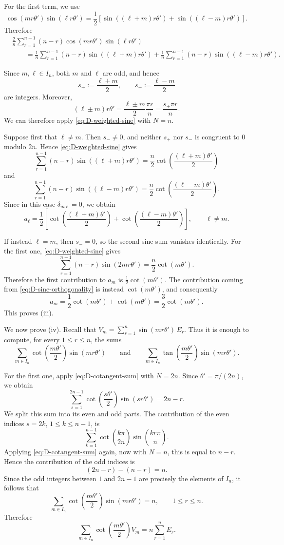 \documentclass[a4paper,reqno]{amsart}
\theoremstyle{plain} %
\theoremstyle{definition} %
\theoremstyle{remark} %
\newcommand{\1}{\mathds{1}}   %
\begin{document}
For the first term, we use
\[
\cos(mr\theta')\sin(\ell r\theta')
=
\frac12
\left[
\sin((\ell+m)r\theta')
+
\sin((\ell-m)r\theta')
\right].
\]
Therefore
\[
\begin{aligned}
&\frac{2}{n}
\sum_{r=1}^{n-1}
(n-r)\cos(mr\theta')\sin(\ell r\theta')
\\
&\qquad =
\frac1n
\sum_{r=1}^{n-1}
(n-r)\sin((\ell+m)r\theta')
+
\frac1n
\sum_{r=1}^{n-1}
(n-r)\sin((\ell-m)r\theta').
\end{aligned}
\]

Since $m,\ell\in I_n$, both $m$ and $\ell$ are odd, and hence
\[
s_+:=\frac{\ell+m}{2},
\qquad
s_-:=\frac{\ell-m}{2}
\]
are integers. Moreover,
\[
(\ell\pm m)r\theta'
=
\frac{\ell\pm m}{2}\frac{\pi r}{n}
=
\frac{s_\pm\pi r}{n}.
\]
We can therefore apply \eqref{eq:D-weighted-sine} with $N=n$.

Suppose first that $\ell\neq m$. Then $s_-\neq0$, and neither
$s_+$ nor $s_-$ is congruent to $0$ modulo $2n$. Hence \eqref{eq:D-weighted-sine} gives
\[
\sum_{r=1}^{n-1}
(n-r)\sin((\ell+m)r\theta')
=
\frac n2
\cot\left(\frac{(\ell+m)\theta'}2\right)
\]
and
\[
\sum_{r=1}^{n-1}
(n-r)\sin((\ell-m)r\theta')
=
\frac n2
\cot\left(\frac{(\ell-m)\theta'}2\right).
\]
Since in this case $\delta_{m\ell}=0$, we obtain
\[
a_\ell
=
\frac12
\left[
\cot\left(\frac{(\ell+m)\theta'}2\right)
+
\cot\left(\frac{(\ell-m)\theta'}2\right)
\right],
\qquad \ell\neq m.
\]

If instead $\ell=m$, then $s_-=0$, so the second sine sum vanishes
identically. For the first one, \eqref{eq:D-weighted-sine} gives
\[
\sum_{r=1}^{n-1}
(n-r)\sin(2mr\theta')
=
\frac n2\cot(m\theta').
\]
Therefore the first contribution to $a_m$ is $\frac12\cot(m\theta')$. 
The contribution coming from \eqref{eq:D-sine-orthogonality} is instead $\cot(m\theta')$,
and consequently
\[
a_m
=
\frac12\cot(m\theta')
+
\cot(m\theta')
=
\frac32\cot(m\theta').
\]
This proves (iii).

We now prove (iv). Recall that $V_m=\sum_{r=1}^n\sin(mr\theta')\,E_{r}$. 
Thus it is enough to compute, for every $1\le r\le n$, the sums
\[
\sum_{m\in I_n}
\cot\left(\frac{m\theta'}2\right)\sin(mr\theta') \qquad \mbox{and} \qquad
\sum_{m\in I_n}
\tan\left(\frac{m\theta'}2\right)\sin(mr\theta').
\]

For the first one, apply \eqref{eq:D-cotangent-sum} with $N=2n$. Since
$\theta'=\pi/(2n)$, we obtain
\[
\sum_{s=1}^{2n-1}
\cot\left(\frac{s\theta'}2\right)
\sin(sr\theta')
=
2n-r.
\]
We split this sum into its even and odd parts. The contribution of the
even indices $s=2k$, $1\le k\le n-1$, is
\[
\sum_{k=1}^{n-1}
\cot\left(\frac{k\pi}{2n}\right)
\sin\left(\frac{kr\pi}{n}\right).
\]
Applying \eqref{eq:D-cotangent-sum} again, now with $N=n$, this is equal to $n-r$.
Hence the contribution of the odd indices is
\[
(2n-r)-(n-r)=n.
\]
Since the odd integers between $1$ and $2n-1$ are precisely the
elements of $I_n$, it follows that
\[
\sum_{m\in I_n}
\cot\left(\frac{m\theta'}2\right)
\sin(mr\theta')
=
n,
\qquad 1\le r\le n.
\]
Therefore
\[
\sum_{m\in I_n}
\cot\left(\frac{m\theta'}2\right)V_m
=
n\sum_{r=1}^n E_r.
\]
\end{document}
